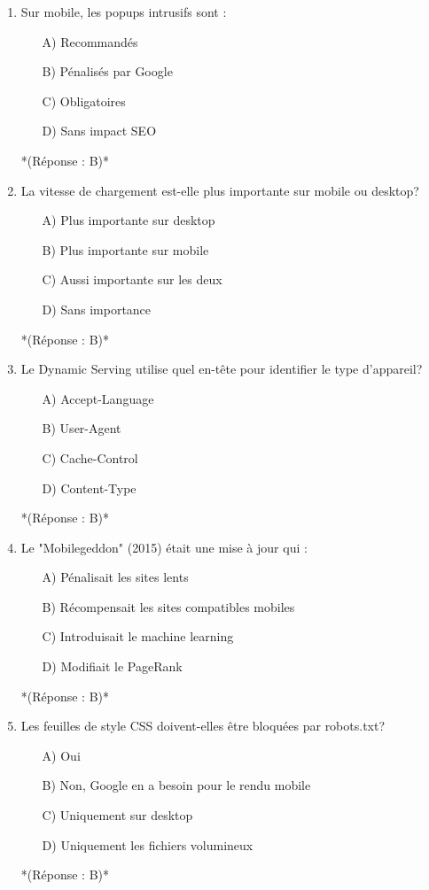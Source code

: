 \documentclass[12pt,a4paper,twoside]{report}
\begin{document}
\begin{enumerate}
\item Sur mobile, les popups intrusifs sont :
\begin{itemize}
\item[A)] Recommandés
\item[B)] Pénalisés par Google
\item[C)] Obligatoires
\item[D)] Sans impact SEO
\end{itemize}
*(Réponse : B)*

\item La vitesse de chargement est-elle plus importante sur mobile ou desktop?
\begin{itemize}
\item[A)] Plus importante sur desktop
\item[B)] Plus importante sur mobile
\item[C)] Aussi importante sur les deux
\item[D)] Sans importance
\end{itemize}
*(Réponse : B)*

\item Le Dynamic Serving utilise quel en-tête pour identifier le type d'appareil?
\begin{itemize}
\item[A)] Accept-Language
\item[B)] User-Agent
\item[C)] Cache-Control
\item[D)] Content-Type
\end{itemize}
*(Réponse : B)*

\item Le "Mobilegeddon" (2015) était une mise à jour qui :
\begin{itemize}
\item[A)] Pénalisait les sites lents
\item[B)] Récompensait les sites compatibles mobiles
\item[C)] Introduisait le machine learning
\item[D)] Modifiait le PageRank
\end{itemize}
*(Réponse : B)*

\item Les feuilles de style CSS doivent-elles être bloquées par robots.txt?
\begin{itemize}
\item[A)] Oui
\item[B)] Non, Google en a besoin pour le rendu mobile
\item[C)] Uniquement sur desktop
\item[D)] Uniquement les fichiers volumineux
\end{itemize}
*(Réponse : B)*


\end{enumerate}
\end{document}
